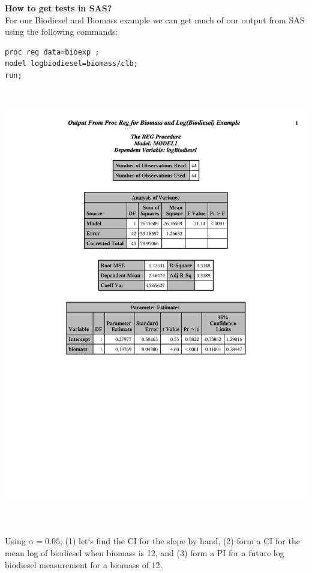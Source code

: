 \textbf{How to get tests in SAS?}\\
For our Biodiesel and Biomass example we can get much of our output from SAS using the following commands:\\
\begin{small}
\begin{verbatim}
proc reg data=bioexp ;
model logbiodiesel=biomass/clb;
run;
\end{verbatim}
\end{small}
~\\
\begin{center}
\includegraphics[scale=0.7,trim= 10mm 105mm 10mm 10mm]{slrbiodiesel}\\
\end{center}

~\\~\\
Using $\alpha=0.05$, (1) let`s find the CI for the slope by hand, (2) form a CI for the mean log of biodiesel when biomass is 12, and (3) form a PI for a future log biodiesel measurement for a biomass of 12.\\

